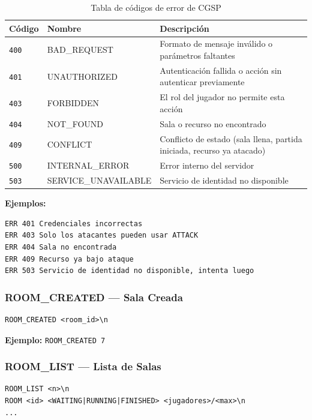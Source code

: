 \documentclass[12pt, letterpaper]{article}
\begin{document}
\begin{table}[H]
\centering
\begin{tabularx}{\textwidth}{l l X}
\toprule
\textbf{Código} & \textbf{Nombre} & \textbf{Descripción} \\
\midrule
\texttt{400} & BAD\_REQUEST & Formato de mensaje inválido o parámetros faltantes \\
\texttt{401} & UNAUTHORIZED & Autenticación fallida o acción sin autenticar previamente \\
\texttt{403} & FORBIDDEN & El rol del jugador no permite esta acción \\
\texttt{404} & NOT\_FOUND & Sala o recurso no encontrado \\
\texttt{409} & CONFLICT & Conflicto de estado (sala llena, partida iniciada, recurso ya atacado) \\
\texttt{500} & INTERNAL\_ERROR & Error interno del servidor \\
\texttt{503} & SERVICE\_UNAVAILABLE & Servicio de identidad no disponible \\
\bottomrule
\end{tabularx}
\caption{Tabla de códigos de error de CGSP}
\end{table}

\textbf{Ejemplos:}
\begin{lstlisting}
ERR 401 Credenciales incorrectas
ERR 403 Solo los atacantes pueden usar ATTACK
ERR 404 Sala no encontrada
ERR 409 Recurso ya bajo ataque
ERR 503 Servicio de identidad no disponible, intenta luego
\end{lstlisting}

\subsubsection{ROOM\_CREATED --- Sala Creada}

\begin{lstlisting}
ROOM_CREATED <room_id>\n
\end{lstlisting}

\textbf{Ejemplo:} \texttt{ROOM\_CREATED 7}

\subsubsection{ROOM\_LIST --- Lista de Salas}

\begin{lstlisting}
ROOM_LIST <n>\n
ROOM <id> <WAITING|RUNNING|FINISHED> <jugadores>/<max>\n
...
\end{lstlisting}
\end{document}
